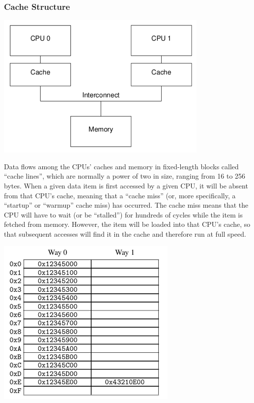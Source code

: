 \documentclass[11pt]{article}
\begin{document}
\subsubsection{Cache Structure}
\label{sec:org54976bb}
\begin{center}
\includegraphics[width=.7\textwidth]{../images/perfbook/1.png}
\end{center}

Data flows among the CPUs’ caches and memory in fixed-length blocks called “cache lines”, which
are normally a power of two in size, ranging from 16 to 256 bytes. When a given data item is
first accessed by a given CPU, it will be absent from that CPU’s cache, meaning that a “cache
miss” (or, more specifically, a “startup” or “warmup” cache miss) has occurred. The cache miss
means that the CPU will have to wait (or be “stalled”) for hundreds of cycles while the item is
fetched from memory. However, the item will be loaded into that CPU’s cache, so that subsequent
accesses will find it in the cache and therefore run at full speed.

\begin{center}
\includegraphics[width=.8\textwidth]{../images/perfbook/2.png}
\end{center}
\end{document}
